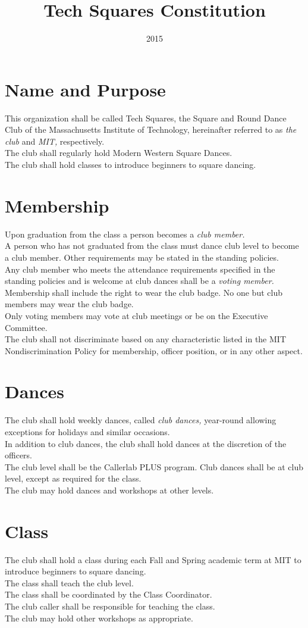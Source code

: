 \documentclass{article}
\title{Tech Squares Constitution}
\date{2015}
\begin{document}
\maketitle
\section {Name and Purpose} 
This organization shall be called Tech Squares, the Square and Round Dance Club of the Massachusetts Institute of Technology, hereinafter referred to as {\it the club\/} and {\it MIT,\/} respectively.\\
The club shall regularly hold Modern Western Square Dances.\\
The club shall hold classes to introduce beginners to square dancing.
\section {Membership}
Upon graduation from the class a person becomes a {\it club member.\/}\\
A person who has not graduated from the class must dance club level to become a club member. Other requirements may be stated in the standing policies.\\
Any club member who meets the attendance requirements specified in the standing policies and is welcome at club dances shall be a {\it voting member.\/}\\
Membership shall include the right to wear the club badge. No one but club members may wear the club badge.\\
Only voting members may vote at club meetings or be on the Executive Committee. \\
The club shall not discriminate based on any characteristic listed in the MIT Nondiscrimination Policy for membership, officer position, or in any other aspect.
\section{Dances}
The club shall hold weekly dances, called {\it club dances,\/} year-round allowing exceptions for holidays and similar occasions.\\
In addition to club dances, the club shall hold dances at the discretion of the officers. \\
The club level shall be the Callerlab PLUS program.   Club dances shall be at club level, except as required for the class.\\
The club may hold dances and workshops at other levels.
\section {Class}
The club shall hold a class during each Fall and Spring academic term at MIT to introduce beginners to square dancing.\\ The class shall teach the club level. \\
The class shall be coordinated by the Class Coordinator.\\
The club caller shall be responsible for teaching the class.\\
The club may hold other workshops as appropriate. \\
\end{document}
